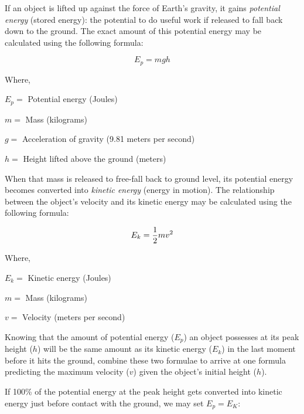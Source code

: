 

If an object is lifted up against the force of Earth's gravity, it gains {\it potential energy} (stored energy): the potential to do useful work if released to fall back down to the ground.  The exact amount of this potential energy may be calculated using the following formula:

$$E_p = m g h$$

\noindent
Where,

$E_p =$ Potential energy (Joules)

$m =$ Mass (kilograms)

$g =$ Acceleration of gravity (9.81 meters per second)

$h =$ Height lifted above the ground (meters)

\vskip 20pt

When that mass is released to free-fall back to ground level, its potential energy becomes converted into {\it kinetic energy} (energy in motion).  The relationship between the object's velocity and its kinetic energy may be calculated using the following formula:

$$E_k = {1 \over 2} m v^2$$

\noindent
Where,

$E_k =$ Kinetic energy (Joules)

$m =$ Mass (kilograms)

$v =$ Velocity (meters per second)

\vskip 20pt

Knowing that the amount of potential energy ($E_p$) an object possesses at its peak height ($h$) will be the same amount as its kinetic energy ($E_k$) in the last moment before it hits the ground, combine these two formulae to arrive at one formula predicting the maximum velocity ($v$) given the object's initial height ($h$).

\vskip 10pt







If 100\% of the potential energy at the peak height gets converted into kinetic energy just before contact with the ground, we may set $E_p = E_K$:

